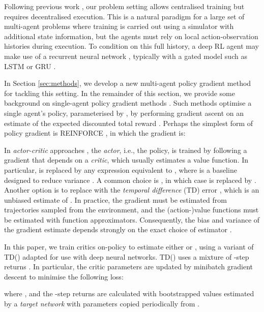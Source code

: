 \documentclass[letterpaper]{article}
\newcommand{\citep}{\cite}
\begin{document}
Following previous work 
\citep{Oliehoek08JAIR,kraemer2016multi,foerster2016learning,jorge2016learning}, 
our problem setting allows centralised training but requires 
decentralised execution. This is a natural paradigm for a large set of 
multi-agent problems where training is carried out using a simulator with 
additional state information, but the agents must rely on local 
action-observation histories during execution. To condition on this full 
history, a deep RL agent may make use of a recurrent neural network 
\citep{hausknecht2015deep}, typically with a gated model such as LSTM 
\citep{hochreiter1997long} or GRU \citep{cho2014properties}.

In Section \ref{sec:methods}, we develop a new multi-agent policy gradient 
method for tackling this setting.  In the remainder of this section, we provide 
some background on single-agent policy gradient methods 
\citep{sutton1999policy}. Such methods optimise a single agent's policy, 
parameterised by , by performing gradient ascent on an estimate of 
the expected discounted total reward . Perhaps the simplest 
form of policy gradient is REINFORCE \citep{williams1992simple}, in which the 
gradient is:

In \emph{actor-critic} approaches 
\citep{sutton1999policy,konda2000actor,DBLP:journals/corr/SchulmanMLJA15},
 the \emph{actor}, i.e., the policy, is trained by following a gradient that 
depends on a \emph{critic}, which usually estimates a value function. In 
particular,  is replaced by any expression equivalent to , where   is a baseline designed to reduce variance 
\citep{weaver2001optimal}.  A common choice is , in which case 
 is replaced by .  Another option is to replace  with 
the \emph{temporal difference} (TD) error , 
which is an unbiased estimate of . In practice, the gradient must 
be estimated from trajectories sampled from the environment, and the 
(action-)value functions must be estimated with function approximators. 
Consequently, the bias and variance of the gradient estimate depends strongly 
on the exact choice of estimator \citep{konda2000actor}. 

In this paper, we  train critics  on-policy to estimate 
either  or , using a variant of TD() \citep{sutton1988learning} 
adapted for use with deep neural networks. TD() uses a mixture of 
-step returns . In particular, the critic parameters  
are updated by minibatch gradient descent to minimise the following loss:

where , 
and the -step returns  are calculated with bootstrapped values 
estimated by a \emph{target network} \citep{mnih2015human} with parameters 
copied periodically from .
\end{document}
